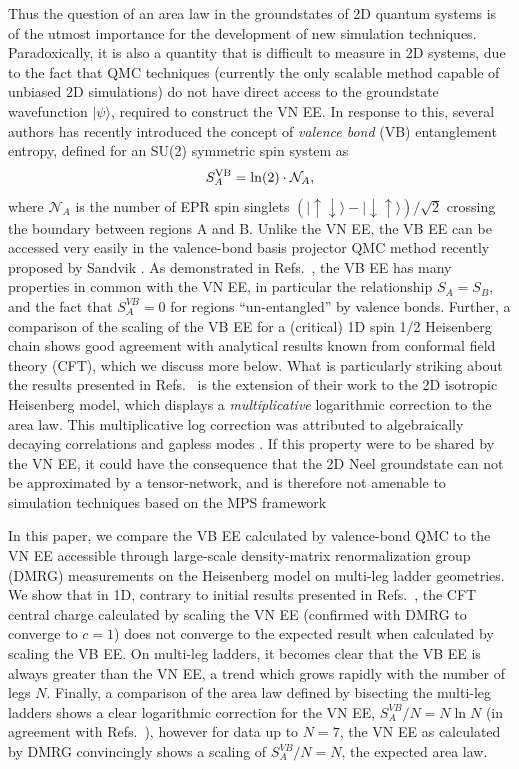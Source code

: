 \documentclass[prl,aps,twocolumn,floatfix,amsmath,amssymb,superscriptaddress,tightenlines]{revtex4}
\begin{document}
Thus the question of an area law in the groundstates of 2D quantum systems is of the utmost importance for the development of new simulation techniques.  Paradoxically, it is also a quantity that is difficult to measure in 2D systems, due to the fact that QMC techniques (currently the only scalable method capable of unbiased 2D simulations) do not have direct access to the groundstate wavefunction $| \psi \rangle$, required to construct the VN EE.  In response to this, several authors \cite{Alet, Chh} has recently introduced the concept of {\it valence bond} (VB) entanglement entropy, defined for an SU(2) symmetric spin system as
\begin{equation}
S^{\rm VB}_A = \ln(2) \cdot \mathcal{N}_A, \label{VBEE}
\end{equation}
where $ \mathcal{N}_A$ is the number of EPR spin singlets ${( |\uparrow \downarrow \rangle - | \downarrow \uparrow \rangle)/\sqrt{2}}$ crossing the boundary between regions A and B.  Unlike the VN EE, the VB EE can be accessed very easily in the valence-bond basis projector QMC method recently proposed by Sandvik \cite{Sandvik}.  
As demonstrated in Refs.~\cite{Alet,Chh}, the VB EE has many properties in common with the VN EE, in particular the relationship $S_A = S_B$, and the fact that $S^{VB}_A=0$ for regions ``un-entangled'' by valence bonds.  Further, a comparison of the scaling of the VB EE for a (critical) 1D spin 1/2 Heisenberg chain shows good agreement with analytical results known from conformal field theory (CFT), which we discuss more below.
What is particularly striking about the results presented in Refs.~\cite{Alet,Chh} is the extension of their work to the 2D isotropic Heisenberg model, which displays a {\it multiplicative} logarithmic correction to the area law.  This multiplicative log correction was attributed to algebraically decaying correlations \cite{Chh} and gapless modes \cite{Alet}.
 If this property were to be shared by the VN EE, it could have the consequence that the 2D Neel groundstate can not be approximated by a tensor-network, and is therefore not amenable to simulation techniques based on the MPS framework
 
In this paper, we compare the VB EE calculated by valence-bond QMC to the VN EE accessible through large-scale density-matrix renormalization group (DMRG) measurements on the Heisenberg model on multi-leg ladder geometries.    We show that in 1D, contrary to initial results presented in Refs.~\cite{Alet,Chh}, the CFT central charge calculated by scaling the VN EE (confirmed with DMRG to converge to $c=1$) does not converge to the expected result when calculated by scaling the VB EE.  On multi-leg ladders, it becomes clear that the VB EE is always greater than the VN EE, a trend which grows rapidly with the number of legs $N$.  Finally, a comparison of the area law defined by bisecting the multi-leg ladders shows a clear logarithmic correction for the VN EE, $S^{VB}_A /N = N \ln N$ (in agreement with Refs.~\cite{Alet,Chh}), however for data up to $N=7$, the VN EE as calculated by DMRG convincingly shows a scaling of $S^{VB}_A /N = N$, the expected area law.
\end{document}
